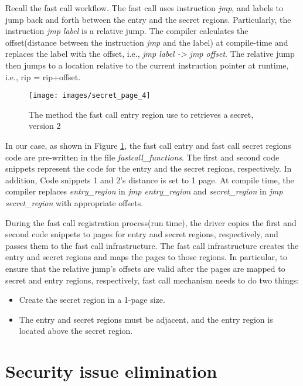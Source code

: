 Recall the fast call workflow. The fast call uses instruction \emph{jmp}, 
and labels to jump back and forth between the entry and the secret regions. 
Particularly, the instruction \emph{jmp label} is a relative jump\cite{14}. 
The compiler calculates the offset(distance between the instruction \emph{jmp}
and the label) at compile-time and replaces the label with the offset, i.e., 
\emph{jmp label -> jmp offset}. The relative jump then jumps to a location relative to the current 
instruction pointer at runtime, i.e., rip = rip+offset.
\begin{figure}[H]
  \centering
  \texttt{[image: images/secret\_page\_4]}
  \caption[The method the fast call entry region use to retrieves a secret, version 2]{The method the fast call entry region use to retrieves a secret, version 2}
   \label{fig:secret_page_4}
\end{figure}
In our case, as shown in Figure \ref{fig:secret_page_4},  the fast call entry and fast call 
secret regions code are pre-written in the file \emph{fastcall\_functions}. 
The first and second code snippets represent the code for the entry and 
the secret regions, respectively. In addition,  Code snippets 1 and 2's 
distance is set to 1 page.  At compile time, the compiler replaces
\emph{entry\_region} in \emph{jmp entry\_region} and \emph{secret\_region} in \emph{jmp secret\_region}  
with appropriate offsets.  



During the fast call registration process(run time), 
the driver copies the first and second code snippets to pages for entry and secret 
regions, respectively, and passes them to the fast call infrastructure. 
The fast call infrastructure creates the entry and secret regions and maps the 
pages to those regions.  In particular, to ensure that the relative jump's offsets are valid after the pages are mapped to secret and entry regions, 
respectively, fast call mechanism needs to do two things:


\begin{itemize}
  \item Create the secret region in a 1-page size.
  \item The entry and secret regions must be adjacent, and the entry region is located above the secret region.
\end{itemize}


\section{Security issue elimination}

